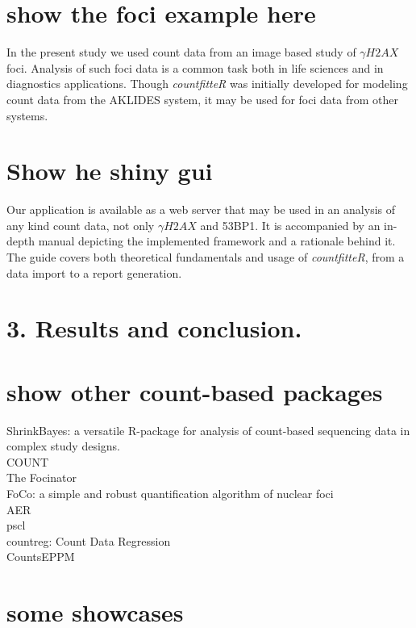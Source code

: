 \section{show the foci example here}

In the present study we used count data from an image based study of $\gamma H2AX$ foci. Analysis of such foci data is a common task both in life sciences and in diagnostics applications. Though \emph{countfitteR} was initially developed for modeling count data from the AKLIDES system, it may be used for foci data from other systems. 

\section{Show he shiny gui}

Our application is available as a web server that may be used in an analysis of any kind count data, not only $\gamma H2AX$ and 53BP1. It is accompanied by an in-depth manual depicting the implemented framework and a rationale behind it. The guide covers both theoretical fundamentals and usage of \emph{countfitteR}, from a data import to a report generation.

\section{3. Results and conclusion.}



\section{show other count-based packages}

ShrinkBayes: a versatile R-package for analysis of count-based sequencing data in complex study designs.\\
COUNT \\
The Focinator \\ %
FoCo: a simple and robust quantification algorithm of nuclear foci \\ %
AER \\
pscl \\
countreg: Count Data Regression \\
CountsEPPM 

\section{some showcases}



